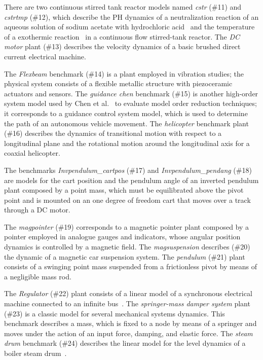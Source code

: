 \documentclass[twocolumn]{autart}    %
\begin{document}
There are two continuous stirred tank reactor models named \textit{cstr} (\#11) and 
\textit{cstrtmp} (\#12), which describe the PH dynamics of a neutralization reaction 
of an aqueous solution of sodium acetate with hydrochloric acid~\cite{cstr} and 
the temperature of a exothermic reaction~\cite{astrom2006advanced} in a continuous 
flow stirred-tank reactor. The \textit{DC motor} plant (\#13) describes the velocity 
dynamics of a basic brushed direct current electrical machine. 

The \textit{Flexbeam} benchmark (\#14) is a plant employed in vibration studies; the 
physical  system consists of a flexible metallic structure with piezoceramic 
actuators and sensors. The \textit{guidance chen} benchmark (\#15) is another 
high-order system model used by Chen et al.~\cite{CHEN1979389}  to evaluate 
model order reduction techniques; it corresponds to a guidance control system model,
which is used to determine the path of an autonomous vehicle movement. The 
\textit{helicopter} benchmark plant (\#16) describes the dynamics of transitional motion 
with respect to a longitudinal plane and the rotational motion around the longitudinal 
axis for a coaxial helicopter.

The benchmarks \textit{Invpendulum\_cartpos} (\#17) and \textit{Invpendulum\_pendang} (\#18)
are models for the cart position and the pendulum angle of an inverted pendulum 
plant composed by a point mass, which must be equilibrated above the pivot point and is 
mounted on an one degree of freedom cart that moves over a track through a DC motor.

The \textit{magpointer} (\#19) corresponds to a magnetic pointer plant composed by a pointer 
employed in analogue gauges and indicators, whose angular position dynamics is 
controlled by a magnetic field. The \textit{magsuspension} describes (\#20) the dynamic of
a magnetic car suspension system. The \textit{pendulum} (\#21) plant consists of a swinging 
point mass suspended from a frictionless pivot by means of a negligible mass rod.

The \textit{Regulator} (\#22) plant consists of a linear model of a synchronous electrical
machine connected to an infinite bus~\cite{KOKOTOVIC198023}. The 
\textit{springer-mass damper system} plant (\#23) is a classic model for several mechanical 
systems dynamics. This benchmark describes a mass, which is fixed to a node by means 
of a springer and moves under the action of an input force, damping, and elastic force.
The \textit{steam drum} benchmark (\#24) describes the linear model for the level dynamics 
of a  boiler steam drum~\cite{boiler}. 
\end{document}
